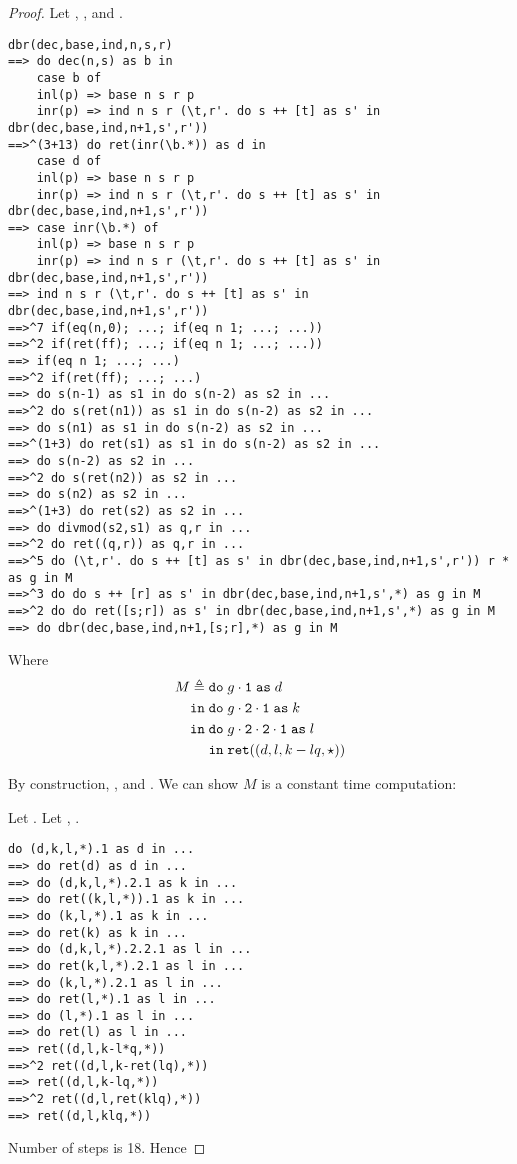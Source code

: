 \begin{proof}
Let , ,  and .
\begin{verbatim}
dbr(dec,base,ind,n,s,r) 
==> do dec(n,s) as b in 
    case b of
    inl(p) => base n s r p
    inr(p) => ind n s r (\t,r'. do s ++ [t] as s' in dbr(dec,base,ind,n+1,s',r')) 
==>^(3+13) do ret(inr(\b.*)) as d in 
    case d of
    inl(p) => base n s r p 
    inr(p) => ind n s r (\t,r'. do s ++ [t] as s' in dbr(dec,base,ind,n+1,s',r')) 
==> case inr(\b.*) of
    inl(p) => base n s r p 
    inr(p) => ind n s r (\t,r'. do s ++ [t] as s' in dbr(dec,base,ind,n+1,s',r')) 
==> ind n s r (\t,r'. do s ++ [t] as s' in dbr(dec,base,ind,n+1,s',r')) 
==>^7 if(eq(n,0); ...; if(eq n 1; ...; ...))
==>^2 if(ret(ff); ...; if(eq n 1; ...; ...))
==> if(eq n 1; ...; ...) 
==>^2 if(ret(ff); ...; ...)
==> do s(n-1) as s1 in do s(n-2) as s2 in ... 
==>^2 do s(ret(n1)) as s1 in do s(n-2) as s2 in ... 
==> do s(n1) as s1 in do s(n-2) as s2 in ...
==>^(1+3) do ret(s1) as s1 in do s(n-2) as s2 in ...
==> do s(n-2) as s2 in ... 
==>^2 do s(ret(n2)) as s2 in ...
==> do s(n2) as s2 in ...
==>^(1+3) do ret(s2) as s2 in ...
==> do divmod(s2,s1) as q,r in ...
==>^2 do ret((q,r)) as q,r in ...
==>^5 do (\t,r'. do s ++ [t] as s' in dbr(dec,base,ind,n+1,s',r')) r * as g in M
==>^3 do do s ++ [r] as s' in dbr(dec,base,ind,n+1,s',*) as g in M
==>^2 do do ret([s;r]) as s' in dbr(dec,base,ind,n+1,s',*) as g in M 
==> do dbr(dec,base,ind,n+1,[s;r],*) as g in M 
\end{verbatim}

Where 
\begin{align*}
M \triangleq \bind{&\fst{g}}{d\\}{
                            \bind{&\fst{\snd{g}}}{k\\}{
                              \bind{&\fst{\snd{\snd{g}}}}{l\\}{
                    &\ret{(d,l,k-lq,\triv)}}}
          }
\end{align*}

By construction, 
, and 
. We can show $M$ is a constant time computation:

Let . Let , .
\begin{verbatim}
do (d,k,l,*).1 as d in ...
==> do ret(d) as d in ...
==> do (d,k,l,*).2.1 as k in ...
==> do ret((k,l,*)).1 as k in ...
==> do (k,l,*).1 as k in ...
==> do ret(k) as k in ...
==> do (d,k,l,*).2.2.1 as l in ... 
==> do ret(k,l,*).2.1 as l in ...
==> do (k,l,*).2.1 as l in ...
==> do ret(l,*).1 as l in ...
==> do (l,*).1 as l in ...
==> do ret(l) as l in ...
==> ret((d,l,k-l*q,*)) 
==>^2 ret((d,l,k-ret(lq),*)) 
==> ret((d,l,k-lq,*)) 
==>^2 ret((d,l,ret(klq),*)) 
==> ret((d,l,klq,*)) 
\end{verbatim}

Number of steps is 18. Hence 

\end{proof}

